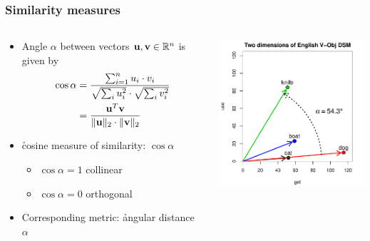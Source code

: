 \documentclass[t]{beamer} %
\begin{document}
\begin{frame}
  \frametitle{Similarity measures}
  
  \begin{columns}[c]
    \begin{column}{5cm}
      \begin{itemize}
        \item Angle $\alpha$ between vectors $\vu,\vv\in \setR^n$ is given by
          \begin{align*}
            \cos \alpha &= 
            \frac{\sum_{i=1}^n u_i\cdot v_i}{
              \sqrt{\sum_i u_i^2}\cdot \sqrt{\sum_i v_i^2}}
            \\
            &= \frac{\vu^T \vv}{\norm[2]{\vu}\cdot \norm[2]{\vv}}
        \end{align*}
      \item<2-> \h{cosine} measure of similarity: $\cos \alpha$
        \begin{itemize}
        \item $\cos \alpha = 1$ \so collinear
        \item $\cos \alpha = 0$ \so orthogonal
        \end{itemize}
      \item<2-> Corresponding metric: \h{angular distance} $\alpha$
      \end{itemize}
    \end{column}
    \begin{column}{6cm}
      \includegraphics[width=6cm]{img/hieroglyph_2d_4}
    \end{column}
  \end{columns}
\end{frame}
\end{document}
